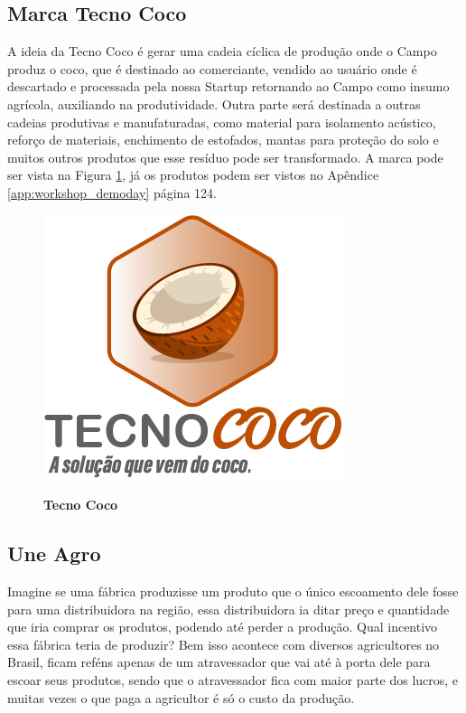 \subsection{Marca Tecno Coco}

A ideia da Tecno Coco é gerar uma cadeia cíclica de produção onde o Campo produz o coco, que é destinado ao comerciante, vendido ao usuário onde é descartado e processada pela nossa Startup retornando ao Campo como insumo agrícola, auxiliando na produtividade. Outra parte será destinada a outras cadeias produtivas e manufaturadas, como material para isolamento acústico, reforço de materiais, enchimento de estofados, mantas para proteção do solo e muitos outros produtos que esse resíduo pode ser transformado. A marca pode ser vista na Figura \ref{figura_50}, já os produtos podem ser vistos no Apêndice \ref{app:workshop_demoday} página 124.


\begin{figure}[H]
\centering
\caption{\textbf{Tecno Coco}}
\includegraphics[scale=2]{Imagens/tecnococo.png}
\label{figura_50}
\end{figure}


\subsection{Une Agro}

Imagine se uma fábrica produzisse um produto que o único escoamento dele fosse para uma distribuidora na região, essa distribuidora ia ditar preço e quantidade que iria comprar os produtos, podendo até perder a produção. Qual incentivo essa fábrica teria de produzir? Bem isso acontece com diversos agricultores no Brasil, ficam reféns apenas de um atravessador que vai até à porta dele para escoar seus produtos, sendo que o atravessador fica com maior parte dos lucros, e muitas vezes o que paga a agricultor é só o custo da produção.

